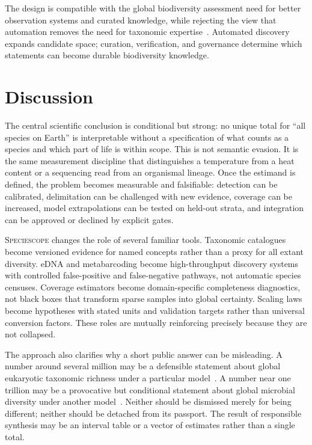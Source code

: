 \documentclass[conference]{IEEEtran}
\newcommand{\specscope}{\textsc{Speciescope}}
\begin{document}
The design is compatible with the global biodiversity assessment need for better observation systems and curated knowledge, while rejecting the view that automation removes the need for taxonomic expertise~\cite{pimm2014,ipbes2019}. Automated discovery expands candidate space; curation, verification, and governance determine which statements can become durable biodiversity knowledge.

\section{Discussion}

The central scientific conclusion is conditional but strong: no unique total for ``all species on Earth'' is interpretable without a specification of what counts as a species and which part of life is within scope. This is not semantic evasion. It is the same measurement discipline that distinguishes a temperature from a heat content or a sequencing read from an organismal lineage. Once the estimand is defined, the problem becomes measurable and falsifiable: detection can be calibrated, delimitation can be challenged with new evidence, coverage can be increased, model extrapolations can be tested on held-out strata, and integration can be approved or declined by explicit gates.

\specscope{} changes the role of several familiar tools. Taxonomic catalogues become versioned evidence for named concepts rather than a proxy for all extant diversity. eDNA and metabarcoding become high-throughput discovery systems with controlled false-positive and false-negative pathways, not automatic species censuses. Coverage estimators become domain-specific completeness diagnostics, not black boxes that transform sparse samples into global certainty. Scaling laws become hypotheses with stated units and validation targets rather than universal conversion factors. These roles are mutually reinforcing precisely because they are not collapsed.

The approach also clarifies why a short public answer can be misleading. A number around several million may be a defensible statement about global eukaryotic taxonomic richness under a particular model~\cite{mora2011}. A number near one trillion may be a provocative but conditional statement about global microbial diversity under another model~\cite{locey2016}. Neither should be dismissed merely for being different; neither should be detached from its passport. The result of responsible synthesis may be an interval table or a vector of estimates rather than a single total.
\end{document}
